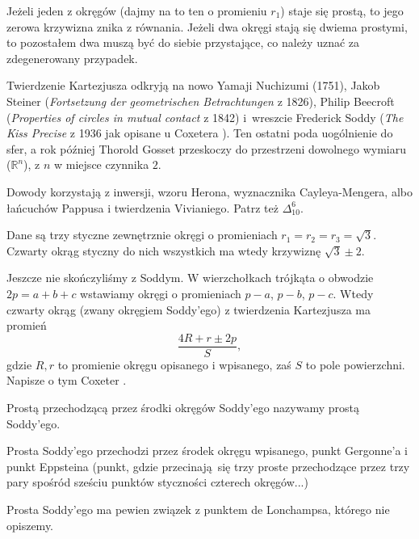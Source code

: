 Jeżeli jeden z okręgów (dajmy na to ten o promieniu $r_1$) staje się prostą, to jego zerowa krzywizna znika z równania.
Jeżeli dwa okręgi stają się dwiema prostymi, to pozostałem dwa muszą być do siebie przystające, co należy uznać za zdegenerowany przypadek.

Twierdzenie Kartezjusza odkryją na nowo Yamaji Nuchizumi (1751), Jakob Steiner (\emph{Fortsetzung der geometrischen Betrachtungen} z 1826), Philip Beecroft (\emph{Properties of circles in mutual contact} z 1842) i~wreszcie Frederick Soddy (\emph{The Kiss Precise} z 1936 jak opisane u Coxetera \cite[s. 29-31]{coxeter_1967}).
%
%
%
%
Ten ostatni poda uogólnienie do sfer, a rok później Thorold Gosset przeskoczy do przestrzeni dowolnego wymiaru ($\mathbb R^n$), z $n$ w miejsce czynnika $2$.
%

Dowody korzystają z inwersji, wzoru Herona, wyznacznika Cayleya-Mengera, albo łańcuchów Pappusa i twierdzenia Vivianiego.
Patrz też $\Delta_{10}^6$. %

\begin{example}
    Dane są trzy styczne zewnętrznie okręgi o promieniach $r_1 = r_2 = r_3 = \sqrt{3}$.
    Czwarty okrąg styczny do nich wszystkich ma wtedy krzywiznę $\sqrt 3 \pm 2$.
\end{example}

Jeszcze nie skończyliśmy z Soddym.
W wierzchołkach trójkąta o obwodzie $2p = a + b + c$ wstawiamy okręgi o promieniach $p - a$, $p - b$, $p - c$.
Wtedy czwarty okrąg (zwany okręgiem Soddy'ego) z twierdzenia Kartezjusza ma promień
\begin{equation}
    \frac{4R + r \pm 2p}{S},
\end{equation}
gdzie $R, r$ to promienie okręgu opisanego i wpisanego, zaś $S$ to pole powierzchni.
Napisze o tym Coxeter \cite[s. 29-31]{coxeter_1967}.

\begin{definition}
    Prostą przechodzącą przez środki okręgów Soddy'ego nazywamy prostą Soddy'ego.
\end{definition}

\begin{proposition}
    Prosta Soddy'ego przechodzi przez środek okręgu wpisanego, punkt Gergonne'a i punkt Eppsteina (punkt, gdzie przecinają się trzy proste przechodzące przez trzy pary spośród sześciu punktów styczności czterech okręgów...)
%
\end{proposition}

Prosta Soddy'ego ma pewien związek z punktem de Lonchampsa, którego nie opiszemy.
%

%